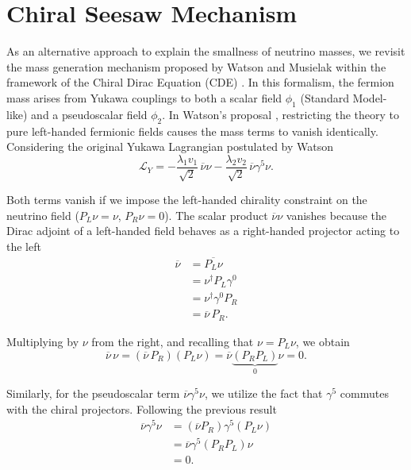 \section{Chiral Seesaw Mechanism}

As an alternative approach to explain the smallness of neutrino masses, we
revisit the mass generation mechanism proposed by Watson and Musielak within the
framework of the Chiral Dirac Equation (CDE)
\cite{watsonChiralSymmetryDirac2020, watsonChiralDiracEquation2021}.
In this formalism, the fermion mass arises from Yukawa couplings to both a
scalar field $\phi_1$ (Standard Model-like) and a pseudoscalar field $\phi_2$.
In Watson's proposal \cite{Watson2022}, restricting the theory to pure
left-handed fermionic fields causes the mass terms to vanish identically.
Considering the original Yukawa Lagrangian postulated by Watson
\begin{equation} \label{eq:original_yukawa}
  \mathcal{L}_Y = -\frac{\lambda_1 v_1}{\sqrt{2}}\,\overline{\nu}\nu -
  \frac{\lambda_2 v_2}{\sqrt{2}}\,\overline{\nu}\gamma^{5}\nu.
\end{equation}

Both terms vanish if we impose the left-handed chirality constraint on the
neutrino field ($P_L \nu = \nu$, $P_R \nu = 0$). The scalar product
$\overline{\nu}\nu$ vanishes because the Dirac adjoint of a left-handed field
behaves as a right-handed projector acting to the left
\begin{equation}
\begin{aligned}
  \overline{\nu} &= \overline{P_L \nu} \\
                 &= \nu^\dagger P_L \gamma^0 \\
                 &= \nu^\dagger \gamma^0 P_R \\
                 &= \overline{\nu}\, P_R .
\end{aligned}
\end{equation}

Multiplying by $\nu$ from the right, and recalling that $\nu = P_L \nu$, we
obtain
\begin{equation}
  \overline{\nu}\, \nu = \left(\overline{\nu}\, P_R\right) \left(P_L
  \nu\right) = \overline{\nu} \underbrace{\left(P_R P_L\right)}_{0} \nu = 0.
\end{equation}

Similarly, for the pseudoscalar term $\overline{\nu} \gamma^{5} \nu$, we utilize
the fact that $\gamma^5$ commutes with the chiral projectors.
Following the previous result
\begin{equation}
\begin{aligned}
  \overline{\nu} \gamma^{5} \nu &= \left(\overline{\nu} P_R\right) \gamma^{5}
  \left(P_L \nu\right) \\
                                &= \overline{\nu} \gamma^{5} \left(P_R P_L\right)
                                \nu \\
                                &= 0.
\end{aligned}
\end{equation}

